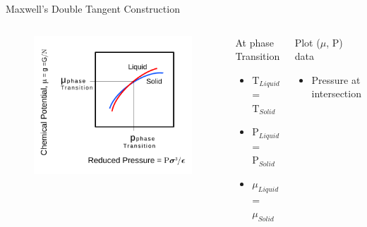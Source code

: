 \documentclass{beamer}
\begin{document}
\begin{frame}{Maxwell's Double Tangent Construction}
	\begin{columns}[t]
        \begin{figure}
            \centering
            \includegraphics[width=\columnwidth]{figs/MaxwellDTC-Fig2.pdf}
          \end{figure}
		\begin{block}{At phase Transition}
			\begin{itemize}
				\item $\text{T}_{Liquid}$ = $\text{T}_{Solid}$
			    \item $\text{P}_{Liquid}$ = $\text{P}_{Solid}$
				\item $\mu_{Liquid}$ = $\mu_{Solid}$
			\end{itemize}
	    \end{block}
		\begin{block}{Plot ($\mu$, P) data}
			\begin{itemize}
				\item Pressure at intersection 
			\end{itemize}
	    \end{block}
	\end{columns}	
\end{frame}
\end{document}
